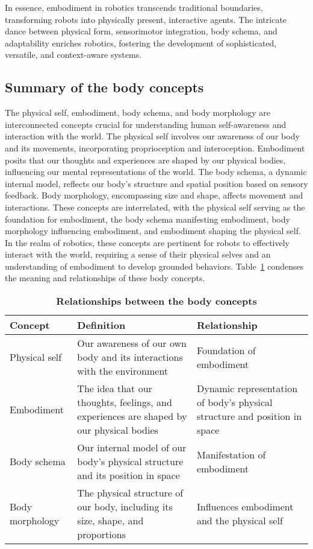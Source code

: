 In essence, embodiment in robotics transcends traditional boundaries, transforming robots into physically present, interactive agents. The intricate dance between physical form, sensorimotor integration, body schema, and adaptability enriches robotics, fostering the development of sophisticated, versatile, and context-aware systems.

\subsection{Summary of the body concepts}
The physical self, embodiment, body schema, and body morphology are interconnected concepts crucial for understanding human self-awareness and interaction with the world. The physical self involves our awareness of our body and its movements, incorporating proprioception and interoception. Embodiment posits that our thoughts and experiences are shaped by our physical bodies, influencing our mental representations of the world. The body schema, a dynamic internal model, reflects our body's structure and spatial position based on sensory feedback. Body morphology, encompassing size and shape, affects movement and interactions. These concepts are interrelated, with the physical self serving as the foundation for embodiment, the body schema manifesting embodiment, body morphology influencing embodiment, and embodiment shaping the physical self. In the realm of robotics, these concepts are pertinent for robots to effectively interact with the world, requiring a sense of their physical selves and an understanding of embodiment to develop grounded behaviors. Table~\ref{tab:body_concepts} condenses the meaning and relationships of these body concepts.
\begin{table}
\begin{center}
	\begin{tabular}{ |m{}|m{}|m{}| } 
		\hline
		\textbf{Concept} & \textbf{Definition} & \textbf{Relationship} \\ 
		\hline
		Physical self & Our awareness of our own body and its interactions with the environment & Foundation of embodiment \\ 
		\hline
		Embodiment & The idea that our thoughts, feelings, and experiences are shaped by our physical bodies & Dynamic representation of body's physical structure and position in space \\ 
		\hline
		Body schema	 & Our internal model of our body's physical structure and its position in space & Manifestation of embodiment \\ 
		\hline		
		Body morphology & The physical structure of our body, including its size, shape, and proportions & Influences embodiment and the physical self\\
		\hline
	\end{tabular}
\end{center}
\caption{\textbf{Relationships between the body concepts}}
\label{tab:body_concepts}
\end{table}



